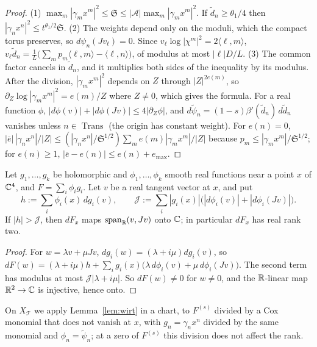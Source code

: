\begin{proof}
(1) $\max_m|\gamma_mx^m|^2\le\mathfrak S\le|\mathcal A|\max_m|\gamma_mx^m|^2$. If $\tilde d_n\ge\theta_1/4$ then
$|\gamma_nx^n|^2\le t^{\theta_1/2}\mathfrak S$. (2) The weights depend only on the moduli, which the compact torus
preserves, so $d\psi_n(Jv_\ell)=0$. Since $v_\ell\log|\chi^m|^2=2\langle\ell,m\rangle$,
$v_\ell\tilde d_n=\frac1L\bigl(\sum_mp_m\langle\ell,m\rangle-\langle\ell,n\rangle\bigr)$, of modulus at most $|\ell|D/L$.
(3) The common factor cancels in $\tilde d_n$, and it multiplies both sides of the inequality by its modulus. After the
division, $|\gamma_mx^m|^2$ depends on $Z$ through $|Z|^{2e(m)}$, so $\partial_Z\log|\gamma_mx^m|^2=e(m)/Z$ where $Z\ne0$,
which gives the formula. For a real function $\phi$, $|d\phi(v)|+|d\phi(Jv)|\le4|\partial_Z\phi|$, and
$d\tilde\psi_n=(1-s)\beta'(\tilde d_n)\,d\tilde d_n$ vanishes unless $n\in\operatorname{Trans}$ (the origin has constant weight).
For $e(n)=0$, $|\bar e|\,|\gamma_nx^n|/|Z|\le(|\gamma_nx^n|/\mathfrak S^{1/2})\sum_me(m)|\gamma_mx^m|/|Z|$ because
$p_m\le|\gamma_mx^m|/\mathfrak S^{1/2}$; for $e(n)\ge1$, $|\bar e-e(n)|\le e(n)+e_{\max}$.
\end{proof}

\begin{lemma}\label{lem:wirt}
Let $g_1,\dots,g_k$ be holomorphic and $\phi_1,\dots,\phi_k$ smooth real functions near a point $x$ of $\mathbb C^4$, and
$F=\sum_i\phi_ig_i$. Let $v$ be a real tangent vector at $x$, and put
\[
h:=\sum_i\phi_i(x)\,dg_i(v),\qquad \mathcal J:=\sum_i|g_i(x)|\bigl(|d\phi_i(v)|+|d\phi_i(Jv)|\bigr).
\]
If $|h|>\mathcal J$, then $dF_x$ maps $\operatorname{span}_\mathbb R(v,Jv)$ onto $\mathbb C$; in particular $dF_x$ has real rank two.
\end{lemma}

\begin{proof}
For $w=\lambda v+\mu Jv$, $dg_i(w)=(\lambda+i\mu)dg_i(v)$, so
$dF(w)=(\lambda+i\mu)h+\sum_ig_i(x)\bigl(\lambda\,d\phi_i(v)+\mu\,d\phi_i(Jv)\bigr)$. The second term has modulus at most
$\mathcal J|\lambda+i\mu|$. So $dF(w)\ne0$ for $w\ne0$, and the $\mathbb R$-linear map $\mathbb R^2\to\mathbb C$ is injective, hence onto.
\end{proof}

On $X_{\mathcal T}$ we apply Lemma~\ref{lem:wirt} in a chart, to $F^{(s)}$ divided by a Cox monomial that does not vanish
at $x$, with $g_n=\gamma_nx^n$ divided by the same monomial and $\phi_n=\tilde\psi_n$; at a zero of $F^{(s)}$ this division
does not affect the rank.

